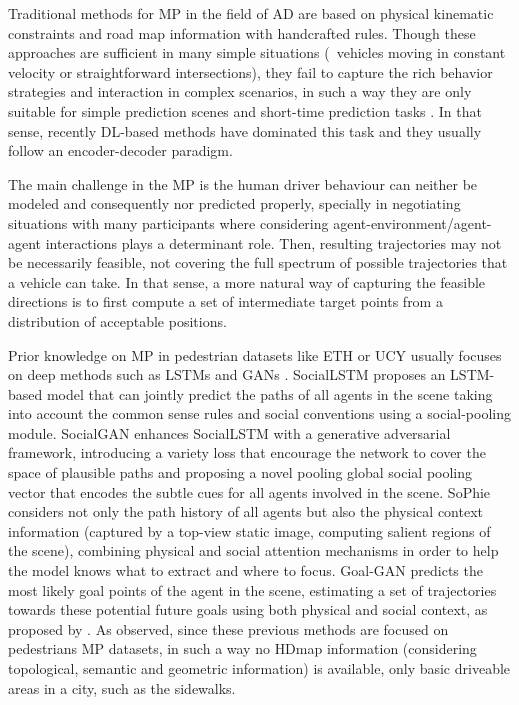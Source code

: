 Traditional methods for \ac{MP} in the field of \ac{AD} are based on physical kinematic constraints and road map information with handcrafted rules. Though these approaches are sufficient in many simple situations (\ie \ vehicles moving in constant velocity or straightforward intersections), they fail to capture the rich behavior strategies and interaction in complex scenarios, in such a way they are only suitable for simple prediction scenes and short-time prediction tasks \cite{huang2022survey}. In that sense, recently \ac{DL}-based methods have dominated this task and they usually follow an encoder-decoder paradigm. 

The main challenge in the \ac{MP} is the human driver behaviour can neither be modeled and consequently nor predicted properly, specially in negotiating situations \cite{gomez2021train} \cite{mercat2020multi} with many participants where considering agent-environment/agent-agent interactions \cite{sadeghian2019sophie} plays a determinant role. Then, resulting trajectories may not be necessarily feasible, not covering the full spectrum of possible trajectories that a vehicle can take. In that sense, a more natural way of capturing the feasible directions \cite{dendorfer2020goal} is to first compute a set of intermediate target points from a distribution of acceptable positions. 

Prior knowledge on \ac{MP} in pedestrian datasets like ETH \cite{pellegrini2009you} or UCY \cite{lerner2007ucydata} usually focuses on deep methods such as \acp{LSTM} \cite{hochreiter1997long} and \acp{GAN} \cite{goodfellow2020generative}. SocialLSTM \cite{alahi2016social} proposes an \ac{LSTM}-based model that can jointly predict the paths of all agents in the scene taking into account the common sense rules and social conventions using a social-pooling module. SocialGAN \cite{gupta2018social} enhances SocialLSTM with a generative adversarial framework, introducing a variety loss that encourage the network to cover the space of plausible paths and proposing a novel pooling global social pooling vector that encodes the subtle cues for all agents involved in the scene. SoPhie \cite{sadeghian2019sophie} considers not only the path history of all agents but also the physical context information (captured by a top-view static image, computing salient regions of the scene), combining physical and social attention mechanisms in order to help the model knows what to extract and where to focus. Goal-GAN \cite{dendorfer2020goal} predicts the most likely goal points of the agent in the scene, estimating a set of trajectories towards these potential future goals using both physical and social context, as proposed by \cite{sadeghian2019sophie}. As observed, since these previous methods are focused on pedestrians \ac{MP} datasets, in such a way no \ac{HDmap} information (considering topological, semantic and geometric information) is available, only basic driveable areas in a city, such as the sidewalks.

